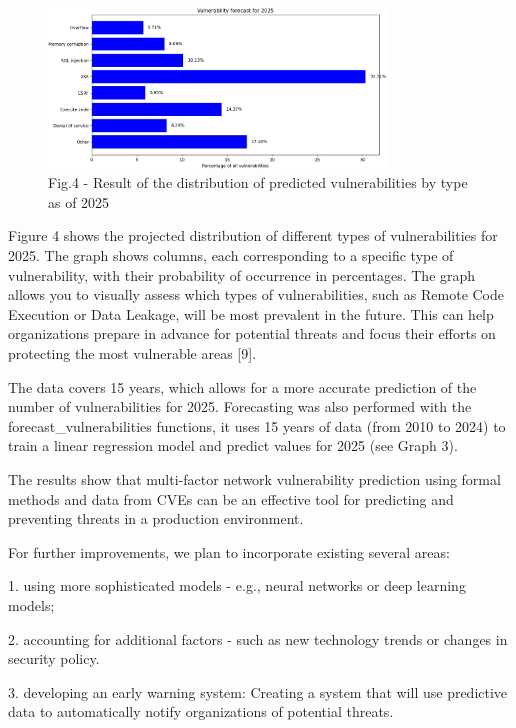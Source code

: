 \begin{figure}[H]
	\centering
	\includegraphics[width=0.8\textwidth]{media/ict2/image167}
	\caption*{Fig.4 - Result of the distribution of predicted vulnerabilities by type as of 2025}
\end{figure}

\begin{multicols}{2}
Figure 4 shows the projected distribution of different types of
vulnerabilities for 2025. The graph shows columns, each corresponding to
a specific type of vulnerability, with their probability of occurrence
in percentages. The graph allows you to visually assess which types of
vulnerabilities, such as Remote Code Execution or Data Leakage, will be
most prevalent in the future. This can help organizations prepare in
advance for potential threats and focus their efforts on protecting the
most vulnerable areas {[}9{]}.

The data covers 15 years, which allows for a more accurate prediction of
the number of vulnerabilities for 2025. Forecasting was also performed
with the forecast\_vulnerabilities functions, it uses 15 years of data
(from 2010 to 2024) to train a linear regression model and predict
values for 2025 (see Graph 3).

The results show that multi-factor network vulnerability prediction
using formal methods and data from CVEs can be an effective tool for
predicting and preventing threats in a production environment.

For further improvements, we plan to incorporate existing several areas:

1. using more sophisticated models - e.g., neural networks or deep
learning models;

2. accounting for additional factors - such as new technology trends or
changes in security policy.

3. developing an early warning system: Creating a system that will use
predictive data to automatically notify organizations of potential
threats.


\end{multicols}
